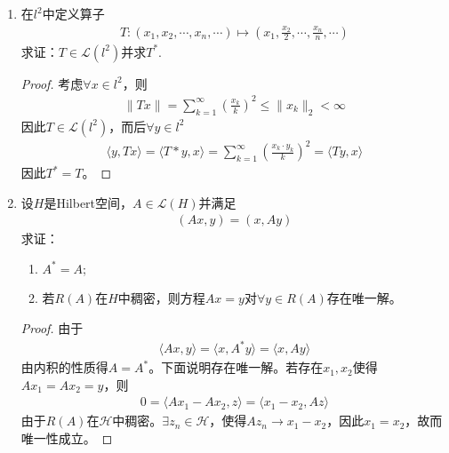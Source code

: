 \begin{enumerate}[leftmargin=2cm, label=\arabic*]
		\item 在$l^2$中定义算子
		\begin{align*}
			T:(x_1,x_2,\cdots,x_n,\cdots) \mapsto \left(x_1,\frac{x_2}{2},\cdots,\frac{x_n}{n}, \cdots \right)
		\end{align*}
		求证：$T\in\mathscr{L}(l^2)$并求$T^*$.
		\begin{proof}
			考虑$\forall x\in l^2$，则
			\begin{align*}
				\|Tx\| = \sum\limits_{k=1}^{\infty} \left(\frac{x_k}{k}\right)^2 \leqslant \|x_k\|_2 < \infty
			\end{align*}
			因此$T\in\mathscr{L}(l^2)$，而后$\forall y\in l^{2}$
			\begin{align*}
				\langle y, Tx\rangle = \langle T*y, x\rangle = \sum\limits_{k=1}^{\infty} \left(\frac{x_k\cdot y_k}{k}\right)^2 = \langle Ty, x\rangle
			\end{align*}
			因此$T^* = T$。
		\end{proof}
		
		\item 设$H$是Hilbert空间，$A\in\mathscr{L}(H)$并满足
		\begin{align*}
			(Ax,y) = (x, Ay)
		\end{align*}
		求证：
		\begin{enumerate}[leftmargin=1cm, label=(\arabic*)]
			\item $A^* = A$;
			\item 若$R(A)$在$H$中稠密，则方程$Ax = y$对$\forall y\in R(A)$存在唯一解。
		\end{enumerate}
		\begin{proof}
			由于
			\begin{align*}
				\langle Ax, y\rangle = \langle x, A^* y\rangle = \langle x, Ay\rangle
			\end{align*}
			由内积的性质得$A = A^*$。下面说明存在唯一解。若存在$x_1,x_2$使得$Ax_1 = Ax_2 = y$，则
			\begin{align*}
				0 = \langle Ax_1 - Ax_2, z\rangle = \langle x_1 - x_2, Az\rangle
			\end{align*}
			由于$R(A)$在$\mathscr{H}$中稠密。$\exists z_n\in\mathscr{H}$，使得$Az_n\to x_1-x_2$，因此$x_1 = x_2$，故而唯一性成立。
		\end{proof}
		

\end{enumerate}
